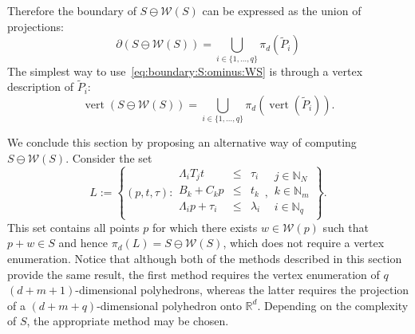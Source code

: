 \documentclass[smallextended]{svjour3}       %
\numberwithin{equation}{section}
\DeclareMathOperator{\vertices}{vert}
\begin{document}
%
%
Therefore the boundary of $S\ominus \mathcal W(S)$ can be expressed as the union of projections:
%
\begin{equation}\label{eq:boundary:S:ominus:WS}
 \partial(S\ominus\mathcal W(S)) = \bigcup_{i\in\{1,\dots,q\}}\pi_d\left(
\tilde P_i
 \right)
\end{equation}
%
The simplest way to use~\eqref{eq:boundary:S:ominus:WS} is through a vertex description of $\tilde P_i$:
%
\begin{equation}\label{the:way:we:compute:p:pontryagin:differences}
  \vertices(S\ominus\mathcal W(S)) =
  \bigcup_{i\in\{1,\dots,q\}}\pi_d(\vertices(\tilde P_i)) .
\end{equation}

We conclude this section by proposing an alternative way of computing $S\ominus\mathcal W(S)$.
%
%
Consider the set
%
\[%
  L := \left\{(p,t,\tau):\begin{array}{rcl}
  \Lambda_iT_jt&\leq&\tau_i\\
  B_k+C_k p&\leq& t_k\\
  \Lambda_i p + \tau_i&\leq&\lambda_i\\
  \end{array},\begin{array}{l}
  j\in\mathbb N_N\\
  k\in\mathbb N_m\\
  i\in\mathbb N_q\end{array}
  \right\} .
\]%
%
This set contains all points $p$ for which there exists $w\in\mathcal W(p)$ such that $p+w\in S$ and hence $\pi_d(L)=S\ominus\mathcal W(S)$, which does not require a vertex enumeration.
%
Notice that although both of the methods described in this section
provide the same result, the first method requires the vertex
enumeration of $q$ $(d + m + 1)$-dimensional polyhedrons, whereas the
latter requires the projection of a $(d + m + q)$-dimensional polyhedron
onto $\mathbb R^d$. Depending on the complexity of $S$, the appropriate method may be chosen.
%
%
%
%
\end{document}
